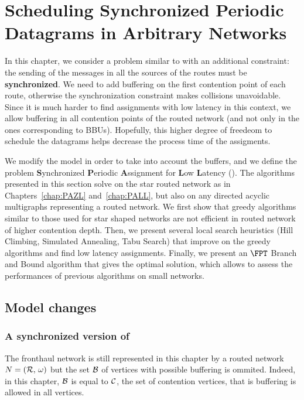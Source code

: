 
\chapter{Scheduling Synchronized Periodic Datagrams in Arbitrary Networks }
\label{chap:SPALL}
\minitoc

In this chapter, we consider a problem similar to \pall with an additional constraint: the sending of the messages in all the sources of the routes must be \textbf{synchronized}. We need to add buffering on the first contention point of each route, otherwise the synchronization constraint makes collisions unavoidable. Since it is much harder to find assignments with low latency in this context, we allow buffering in all contention points of the routed network (and not only in the ones corresponding to BBUs). Hopefully, this higher degree of freedeom to schedule the datagrams helps decrease the process time of the assigments.

We modify the model in order to take into account the buffers, and we define the problem \textbf{S}ynchronized \textbf{P}eriodic \textbf{A}ssignment for \textbf{L}ow \textbf{L}atency (\spall). The algorithms presented in this section solve \spall on the star routed network as in Chapters~\ref{chap:PAZL} and~\ref{chap:PALL}, but also on any directed acyclic multigraphs representing a routed network. We first show that greedy algorithms similar to those used for star shaped networks are not efficient in routed network of higher contention depth. Then, we present several local search heuristics (Hill Climbing, Simulated Annealing, Tabu Search) that improve on the greedy algorithms and find low latency assignments. Finally, we present an $\FPT$ Branch and Bound algorithm that gives the optimal solution, which allows to assess the performances of previous algorithms on small networks.


\section{Model changes}
\subsection{A synchronized version of \pall}

The fronthaul network is still represented in this chapter by a routed network $N = ({\cal R},\,\omega)$ but the set ${\cal B}$ of vertices with possible buffering is ommited. Indeed, in this chapter, ${\cal B}$ is equal to ${\cal C}$, the set of contention vertices, that is buffering is allowed in all vertices. 


